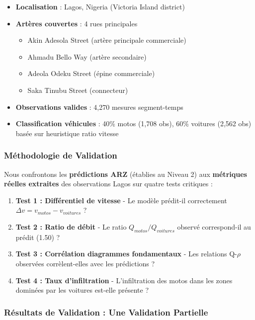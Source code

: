 \begin{itemize}
    \item \textbf{Localisation} : Lagos, Nigeria (Victoria Island district)
    \item \textbf{Artères couvertes} : 4 rues principales
          \begin{itemize}
              \item Akin Adesola Street (artère principale commerciale)
              \item Ahmadu Bello Way (artère secondaire)
              \item Adeola Odeku Street (épine commerciale)
              \item Saka Tinubu Street (connecteur)
          \end{itemize}
    \item \textbf{Observations valides} : 4,270 mesures segment-temps
    \item \textbf{Classification véhicules} : 40\% motos (1,708 obs), 60\% voitures (2,562 obs) basée sur heuristique ratio vitesse
\end{itemize}

\subsubsection{Méthodologie de Validation}
\label{subsec:methodologie_validation_lagos}

Nous confrontons les \textbf{prédictions ARZ} (établies au Niveau 2) aux \textbf{métriques réelles extraites} des observations Lagos sur quatre tests critiques :

\begin{enumerate}
    \item \textbf{Test 1 : Différentiel de vitesse} - Le modèle prédit-il correctement $\Delta v = v_{motos} - v_{voitures}$ ?
    \item \textbf{Test 2 : Ratio de débit} - Le ratio $Q_{motos}/Q_{voitures}$ observé correspond-il au prédit (1.50) ?
    \item \textbf{Test 3 : Corrélation diagrammes fondamentaux} - Les relations Q-$\rho$ observées corrèlent-elles avec les prédictions ?
    \item \textbf{Test 4 : Taux d'infiltration} - L'infiltration des motos dans les zones dominées par les voitures est-elle présente ?
\end{enumerate}

\subsubsection{Résultats de Validation : Une Validation Partielle}
\label{subsec:resultats_validation_lagos}

